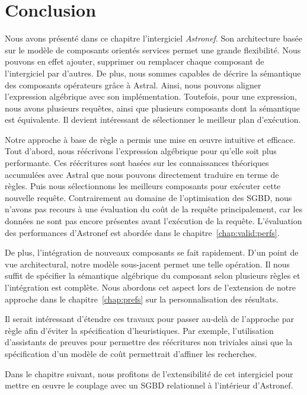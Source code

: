 \section{Conclusion}\label{sec:contrib:astronef:conclusion}
Nous avons présenté dans ce chapitre l'intergiciel \textit{Astronef}. Son architecture basée sur le modèle de composants orientés services permet une grande flexibilité. Nous pouvons en effet ajouter, supprimer ou remplacer chaque composant de l'intergiciel par d'autres. De plus, nous sommes capables de décrire la sémantique des composants opérateurs grâce à Astral. Ainsi, nous pouvons aligner l'expression algébrique avec son implémentation. Toutefois, pour une expression, nous avons plusieurs requêtes, ainsi que plusieurs composants dont la sémantique est équivalente. Il devient intéressant de sélectionner le meilleur plan d'exécution.

Notre approche à base de règle a permis une mise en œuvre intuitive et efficace. Tout d'abord, nous réécrivons l'expression algébrique pour qu'elle soit plus performante. Ces réécritures sont basées sur les connaissances théoriques accumulées avec Astral que nous pouvons directement traduire en terme de règles. Puis nous sélectionnons les meilleurs composants pour exécuter cette nouvelle requête. Contrairement au domaine de l'optimisation des SGBD, nous n'avons pas recours à une évaluation du coût de la requête principalement, car les données ne sont pas encore présentes avant l'exécution de la requête. L'évaluation des performances d'Astronef est abordée dans le chapitre~\ref{chap:valid:perfs}. 

De plus, l'intégration de nouveaux composants se fait rapidement. D'un point de vue architectural, notre modèle sous-jacent permet une telle opération. Il nous suffit de spécifier la sémantique algébrique du composant selon plusieurs règles et l'intégration est complète. Nous abordons cet aspect lors de l'extension de notre approche dans le chapitre~\ref{chap:prefs} sur la personnalisation des résultats.

Il serait intéressant d'étendre ces travaux pour passer au-delà de l'approche par règle afin d'éviter la spécification d'heuristiques. Par exemple, l'utilisation d'assistants de preuves pour permettre des réécritures non triviales ainsi que la spécification d'un modèle de coût permettrait d'affiner les recherches.

Dans le chapitre suivant, nous profitons de l'extensibilité de cet intergiciel pour mettre en œuvre le couplage avec un SGBD relationnel à l'intérieur d'Astronef.

